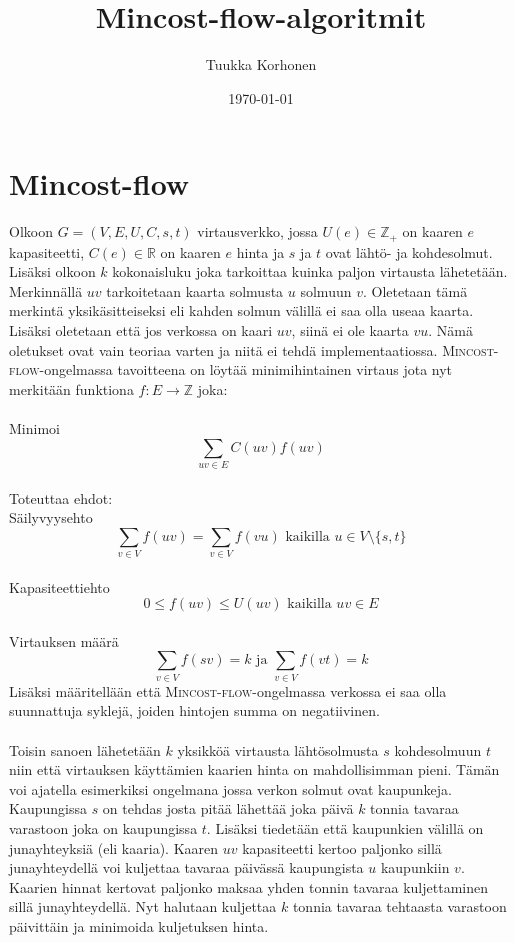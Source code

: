 \documentclass[a4paper, 11pt]{article}
\title{Mincost-flow-algoritmit}
\author{Tuukka Korhonen}
\date{\today}
\begin{document}
\maketitle
\noindent
\section*{Mincost-flow}
Olkoon $G = (V, E, U, C, s, t)$ virtausverkko, jossa $U(e) \in \mathbb{Z_+}$ on 
kaaren $e$ kapasiteetti, $C(e) \in \mathbb{R}$ on kaaren $e$ hinta ja $s$ ja $t$
ovat lähtö- ja kohdesolmut. Lisäksi olkoon $k$ kokonaisluku joka tarkoittaa
kuinka paljon virtausta lähetetään. Merkinnällä $uv$ tarkoitetaan kaarta solmusta
$u$ solmuun $v$. Oletetaan tämä merkintä yksikäsitteiseksi eli 
kahden solmun välillä ei
saa olla useaa kaarta. Lisäksi oletetaan että jos verkossa on kaari $uv$, siinä
ei ole kaarta $vu$. Nämä oletukset ovat vain teoriaa varten ja niitä ei tehdä
implementaatiossa. \textsc{Mincost-flow}-ongelmassa tavoitteena on löytää minimihintainen virtaus jota 
nyt merkitään funktiona
$f : E \rightarrow \mathbb{Z}$ joka: \\\\ Minimoi $$\sum_{uv \in E} C(uv) f(uv)$$\\
Toteuttaa ehdot:\\ Säilyvyysehto
$$\sum_{v \in V} f(uv) = \sum_{v \in V} f(vu) \text{ kaikilla } u \in V \setminus \{s, t\}$$
\\Kapasiteettiehto
$$0 \le f(uv) \le U(uv) \text{ kaikilla } uv \in E$$
\\Virtauksen määrä
$$\sum_{v \in V} f(sv) = k \text{ ja } \sum_{v \in V} f(vt) = k$$
Lisäksi määritellään että \textsc{Mincost-flow}-ongelmassa verkossa ei saa olla
suunnattuja syklejä, joiden hintojen summa on negatiivinen.\\\\

\noindent
Toisin sanoen lähetetään $k$ yksikköä virtausta lähtösolmusta $s$ kohdesolmuun $t$ niin
että virtauksen käyttämien kaarien hinta on mahdollisimman pieni. Tämän voi ajatella
esimerkiksi ongelmana jossa verkon solmut ovat kaupunkeja. Kaupungissa $s$ on tehdas
josta pitää lähettää joka päivä $k$ tonnia tavaraa varastoon joka on kaupungissa $t$.
Lisäksi tiedetään että kaupunkien välillä on junayhteyksiä (eli kaaria). Kaaren $uv$
kapasiteetti kertoo paljonko sillä junayhteydellä voi kuljettaa tavaraa päivässä
kaupungista $u$ kaupunkiin $v$. Kaarien hinnat kertovat paljonko maksaa yhden tonnin
tavaraa kuljettaminen sillä junayhteydellä. Nyt halutaan kuljettaa $k$ tonnia tavaraa
tehtaasta varastoon päivittäin ja minimoida  kuljetuksen hinta.\\\\
\end{document}
